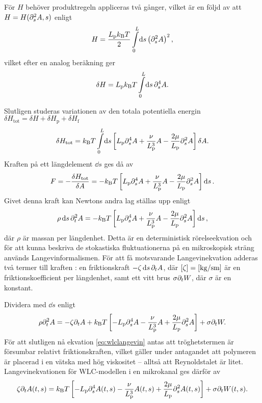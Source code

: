 För $H$ behöver produktregeln appliceras två gånger, vilket är en följd av att $H = H(\partial_s^2A,s)$ enligt 
\begin{equation}
     H = \frac{ L_\text{p}\kbT}{2}\int_0^L\!\dd{s}\left(\pd_s^2A\right)^2,
\end{equation}
vilket efter en analog beräkning ger 
\begin{equation}
     \delta H = L_\text{p}\kbT \int_0^L\!\dd{s} \pd_s^4A.
\end{equation}

Slutligen studeras variationen av den totala potentiella energin $\delta H_\text{tot} = \delta H + \delta H_{\text{p}} + \delta H_{\text{f}}$ 
\begin{equation}
     \delta H_\text{tot} = \kbT\int_0^L\!\dd{s} \left[L_\text{p}\pd_s^4A+\frac{\nu}{L_\text{p}^3}A -\frac{2\mu}{L_\text{p}}\pd_s^2A\right]\delta A. 
\end{equation}
Kraften på ett längdelement $\dd{s}$ ges då av 
\begin{equation}\label{eq:F}
      F = -\frac{\delta H_\text{tot}}{\delta A} = -k_{\text{B}}T\left[L_\text{p}\partial_s^4A+\frac{\nu}{L_\text{p}^3}A-\frac{2\mu}{L_\text{p}}\partial_s^2A \right]\dd{s} .
\end{equation}
Givet denna kraft kan Newtons andra lag ställas upp enligt 
\begin{equation}
      \rho\dd{s}\partial_t^2A = -k_{\text{B}}T\left[L_\text{p}\partial_s^4A+\frac{\nu}{L_\text{p}^3}A-\frac{2\mu}{L_\text{p}}\partial_s^2A \right]\dd{s},
\end{equation}
där $\rho$ är massan per längdenhet. Detta är en deterministisk rörelseekvation och för att kunna beskriva de stokastiska fluktuationerna på en mikroskopisk sträng används Langevinformalismen. För att få motsvarande Langevinekvation adderas två termer till kraften \cite{Bullerjahn2011,Dhar,VanKampen2007}: en friktionskraft $-\zeta\dd{s}\partial_tA$, där $[\zeta] = \unit[]{[kg/sm]}$ är en friktionskoefficient per längdenhet, samt ett vitt brus $\sigma\partial_t W$, där $\sigma$ är en konstant.

Dividera med $\dd{s}$ enligt 
\begin{equation}
      \rho\partial_t^2A = -\zeta\partial_tA+ k_{\text{B}}T\left[-L_\text{p}\partial_s^4A-\frac{\nu}{L_\text{p}^3}A+\frac{2\mu}{L_\text{p}}\partial_s^2A \right]+\sigma\partial_tW.
\end{equation}
För att slutligen nå ekvation \eqref{eq:wlclangevin} antas att tröghetstermen är försumbar relativt friktionskraften, vilket gäller under antagandet att polymeren är placerad i en vätska med hög viskositet \cite{Dhar} -- alltså att Reynoldstalet är litet. Langevinekvationen för WLC-modellen i en mikrokanal ges därför av
\begin{equation}
    \zeta\partial_tA(t,s) = k_{\text{B}}T\left[-L_\text{p}\partial_s^4A(t,s)-\frac{\nu}{L_\text{p}^3}A(t,s)+\frac{2\mu}{L_\text{p}}\partial_s^2A(t,s) \right]+\sigma\partial_tW(t,s).
\end{equation}



